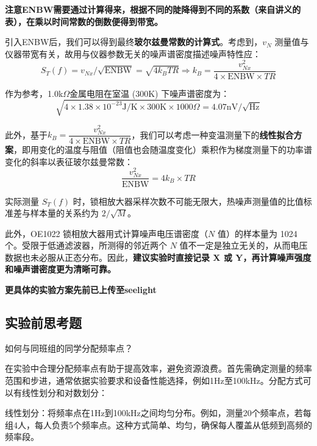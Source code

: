 \documentclass[dvipsnames, svgnames,a4paper,11pt]{article}
\begin{document}
\begin{enumerate}
		\textbf{注意ENBW需要通过计算得来，根据不同的陡降得到不同的系数（来自讲义的表），在乘以时间常数的倒数便得到带宽。}
		
		引入ENBW后，我们可以得到最终\textbf{玻尔兹曼常数的计算式}。考虑到，$v_N$ 测量值与仪器带宽有关，故用与仪器参数无关的噪声谱密度描述噪声特性应：
			$$
			S_T(f)=v_{Nx}/\sqrt{\text{ENBW}} = \sqrt{4k_BTR} \Rightarrow k_B = \dfrac{v_{Nx}^2}{4\times\text{ENBW}\times TR}
			$$
		
		作为参考，1.0k$\Omega$金属电阻在室温 (300K) 下噪声谱密度为：
		\[
		\sqrt{4 \times 1.38 \times 10^{-23} \text{J/K} \times 300\text{K} \times 1000\Omega} = 4.07\text{nV}/\sqrt{\text{Hz}}
		\]
		
		此外，基于$k_B = \dfrac{v_{Nx}^2}{4\times\text{ENBW}\times TR}$，我们可以考虑一种变温测量下的\textbf{线性拟合方案}，即用变化的温度与阻值（阻值也会随温度变化）乘积作为梯度测量下的功率谱变化的斜率以表征玻尔兹曼常数：
		$$
		\dfrac{v_{Nx}^2}{\text{ENBW}}=4k_B\times TR
		$$
		
		实际测量 $S_T(f)$ 时，锁相放大器采样次数不可能无限大，热噪声测量值的比值标准差与样本量的关系约为 $2/\sqrt{M}$。
		
		此外，OE1022 锁相放大器用式计算噪声电压谱密度（$N$ 值）的样本量为 1024 个。受限于低通滤波器，所测得的邻近两个 $N$ 值不一定是独立无关的，从而电压数据也未必服从正态分布。因此，\textbf{建议实验时直接记录 X 或 Y，再计算噪声强度和噪声谱密度更为清晰可靠。}
		
	\end{enumerate}

	\vspace{1cm}
	\textbf{\huge 更具体的实验方案先前已上传至seelight}






\clearpage
\subsection{实验前思考题}

\begin{question}
	如何与同班组的同学分配频率点？
\end{question}


	在实验中合理分配频率点有助于提高效率，避免资源浪费。首先需确定测量的频率范围和步进，通常依据实验要求和设备性能选择，例如1Hz至100kHz。分配方式可以有线性划分和对数划分：

	线性划分：将频率点在1Hz到100kHz之间均匀分布。例如，测量20个频率点，若每组4人，每人负责5个频率点。这种方式简单、均匀，确保每人覆盖从低频到高频的频率段。
\end{document}
